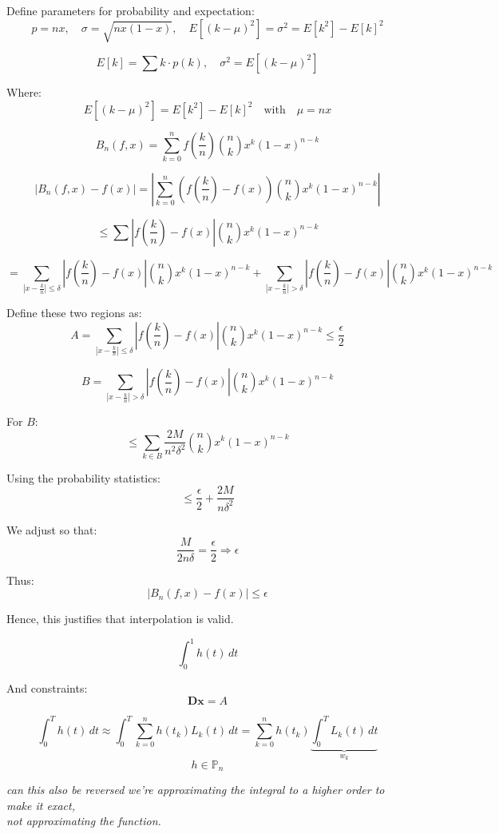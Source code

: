 \documentclass[12pt]{report} %
\begin{document}
Define parameters for probability and expectation:
\[
p = nx, \quad \sigma = \sqrt{n x (1 - x)}, \quad E[(k - \mu)^2] = \sigma^2 = E[k^2] - E[k]^2
\]

\[
E[k] = \sum k \cdot p(k), \quad \sigma^2 = E[(k - \mu)^2]
\]

Where:
\[
E[(k - \mu)^2] = E[k^2] - E[k]^2 \quad \text{with} \quad \mu = nx
\]

\[
B_n(f, x) = \sum_{k=0}^{n} f\left( \frac{k}{n} \right) \binom{n}{k} x^k (1 - x)^{n-k}
\]

\[
|B_n(f, x) - f(x)| = \left| \sum_{k=0}^{n} \left( f\left( \frac{k}{n} \right) - f(x) \right) \binom{n}{k} x^k (1 - x)^{n-k} \right|
\]

\[
\leq \sum \left| f\left( \frac{k}{n} \right) - f(x) \right| \binom{n}{k} x^k (1 - x)^{n-k}
\]

\[
= \sum_{|x - \frac{k}{n}| \leq \delta} \left| f\left( \frac{k}{n} \right) - f(x) \right| \binom{n}{k} x^k (1 - x)^{n-k} + \sum_{|x - \frac{k}{n}| > \delta} \left| f\left( \frac{k}{n} \right) - f(x) \right| \binom{n}{k} x^k (1 - x)^{n-k}
\]

Define these two regions as:
\[
A = \sum_{|x - \frac{k}{n}| \leq \delta} \left| f\left( \frac{k}{n} \right) - f(x) \right| \binom{n}{k} x^k (1 - x)^{n-k} \leq \frac{\epsilon}{2}
\]

\[
B = \sum_{|x - \frac{k}{n}| > \delta} \left| f\left( \frac{k}{n} \right) - f(x) \right| \binom{n}{k} x^k (1 - x)^{n-k} 
\]

For \( B \):
\[
\leq \sum_{k \in B} \frac{2M}{n^2 \delta^2} \binom{n}{k} x^k (1 - x)^{n-k}
\]

Using the probability statistics:
\[
\leq \frac{\epsilon}{2} + \frac{2M}{n \delta^2}
\]

We adjust so that:
\[
\frac{M}{2n\delta} = \frac{\epsilon}{2} \Rightarrow \epsilon
\]

Thus:
\[
|B_n(f, x) - f(x)| \leq \epsilon
\]

Hence, this justifies that interpolation is valid.

\[
\int_0^1 h(t) \, dt
\]

And constraints:
\[
\mathbf{D} \mathbf{x} = A
\]


\[
\int_{0}^{T} h(t) \, dt \approx \int_{0}^{T} \sum_{k=0}^{n} h(t_k) L_k(t) \, dt 
= \sum_{k=0}^{n} h(t_k) \underbrace{\int_{0}^{T} L_k(t) \, dt}_{w_k}
\]
\[
h \in \mathbb{P}_n
\]

\noindent
{\textit{can this also be reversed}} \hspace{3cm}
{\textit{we're approximating the integral to a higher order to make it exact,}} \\
{\textit{not approximating the function.}}
\end{document}
